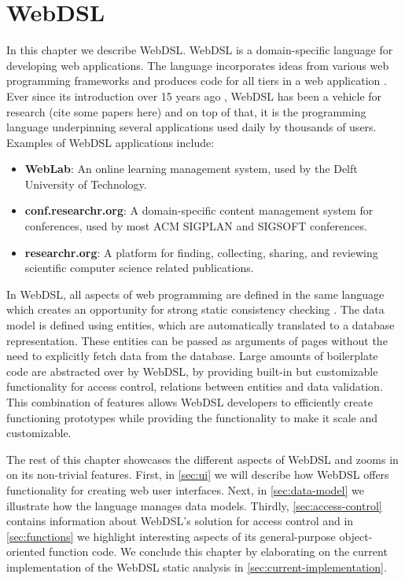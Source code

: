 
\chapter{\label{chap:webdsl}WebDSL}

  In this chapter we describe WebDSL. WebDSL is a domain-specific language for developing web applications. The language incorporates ideas from various web programming frameworks and produces code for all tiers in a web application \autocite{Groenewegen2020}. Ever since its introduction over 15 years ago \autocite{Visser2007}, WebDSL has been a vehicle for research (cite some papers here) and on top of that, it is the programming language underpinning several applications used daily by thousands of users. Examples of WebDSL applications include:

  \begin{itemize}
    \item \textbf{WebLab}: An online learning management system, used by the Delft University of Technology.
    \item \textbf{conf.researchr.org}: A domain-specific content management system for conferences, used by most ACM SIGPLAN and SIGSOFT conferences.
    \item \textbf{researchr.org}: A platform for finding, collecting, sharing, and reviewing scientific computer science related publications.
  \end{itemize}

  In WebDSL, all aspects of web programming are defined in the same language which creates an opportunity for strong static consistency checking \autocite{Hemel2011}. The data model is defined using entities, which are automatically translated to a database representation. These entities can be passed as arguments of pages without the need to explicitly fetch data from the database. Large amounts of boilerplate code are abstracted over by WebDSL, by providing built-in but customizable functionality for access control, relations between entities and data validation. This combination of features allows WebDSL developers to efficiently create functioning prototypes while providing the functionality to make it scale and customizable.

  The rest of this chapter showcases the different aspects of WebDSL and zooms in on its non-trivial features. First, in \cref{sec:ui} we will describe how WebDSL offers functionality for creating web user interfaces. Next, in \cref{sec:data-model} we illustrate how the language manages data models. Thirdly, \cref{sec:access-control} contains information about WebDSL's solution for access control and in \cref{sec:functions} we highlight interesting aspects of its general-purpose object-oriented function code. We conclude this chapter by elaborating on the current implementation of the WebDSL static analysis in \cref{sec:current-implementation}.

